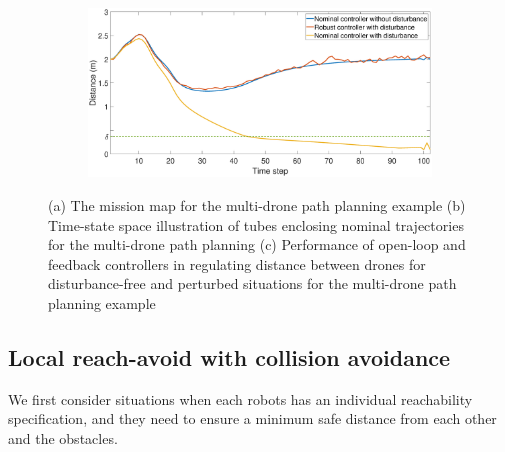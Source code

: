 \begin{figure}[t]
\begin{subfigure}[b]{0.4\textwidth}
         \includegraphics[width=\textwidth]{figures/multi_drone2.eps}
         \caption{}
         \label{fig:multi_drone_distance}
     \end{subfigure}
        \caption{(a) The mission map for the multi-drone path planning example (b) Time-state space illustration of tubes enclosing nominal trajectories for the multi-drone path planning (c) Performance of open-loop and feedback controllers in regulating distance between drones for disturbance-free and perturbed situations for the multi-drone path planning example}
        \label{fig:three figures}
\end{figure}

\subsection{Local reach-avoid with collision avoidance}
\label{sec:local reach-avoid}

We first consider situations when each robots has an individual reachability specification, 
and they need to ensure a minimum safe distance from each other and the obstacles.

